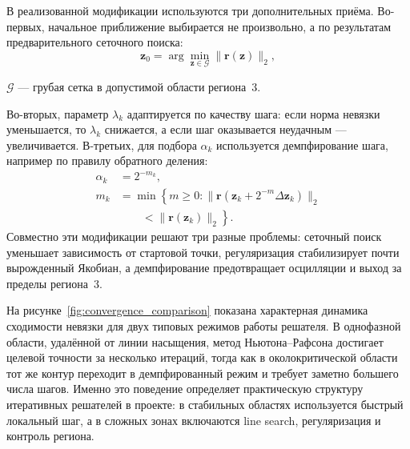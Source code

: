 В реализованной модификации используются три дополнительных приёма.
Во-первых, начальное приближение выбирается
не произвольно,
а по результатам предварительного сеточного поиска:
\begin{equation}
\mathbf{z}_{0} = \arg\min_{\mathbf{z}\in\mathcal{G}}
\|\mathbf{r}(\mathbf{z})\|_{2},
\end{equation}
\begin{gostwhere}
\item $\mathcal{G}$ --- грубая сетка в допустимой области региона~3.
\end{gostwhere}

Во-вторых, параметр $\lambda_{k}$ адаптируется по качеству шага:
если норма невязки уменьшается,
то $\lambda_{k}$ снижается,
а если шаг оказывается неудачным ---
увеличивается.
В-третьих, для подбора $\alpha_{k}$
используется демпфирование шага,
например по правилу обратного деления:
\begin{equation}
\begin{aligned}
\alpha_{k} &= 2^{-m_{k}}, \\
m_{k} &= \min\left\{
m \ge 0 :
\|\mathbf{r}(\mathbf{z}_{k} + 2^{-m}\Delta \mathbf{z}_{k})\|_{2}
\right. \\
&\qquad \left.
<
\|\mathbf{r}(\mathbf{z}_{k})\|_{2}
\right\}.
\end{aligned}
\end{equation}
Совместно эти модификации решают три разные проблемы:
сеточный поиск уменьшает зависимость от стартовой точки,
регуляризация стабилизирует почти вырожденный Якобиан,
а демпфирование предотвращает осцилляции и выход за пределы региона~3.

На рисунке~\ref{fig:convergence_comparison} показана характерная динамика
сходимости невязки для двух типовых режимов работы решателя.
В однофазной области, удалённой от линии насыщения,
метод Ньютона--Рафсона достигает целевой точности
за несколько итераций,
тогда как в околокритической области
тот же контур переходит в демпфированный режим
и требует заметно большего числа шагов.
Именно это поведение определяет практическую структуру
итеративных решателей в проекте:
в стабильных областях используется быстрый локальный шаг,
а в сложных зонах включаются line search,
регуляризация и контроль региона.

